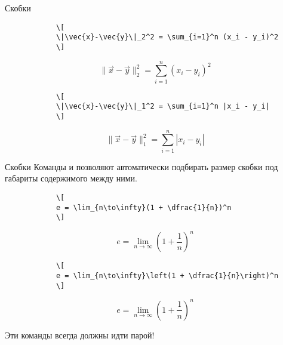 \begin{frame}[fragile]{Скобки}
	\begin{center}
		
	\end{center}
	
	\begin{minipage}{0.74\textwidth}
		\begin{verbatim}
			\[
			\|\vec{x}-\vec{y}\|_2^2 = \sum_{i=1}^n (x_i - y_i)^2  
			\]
		\end{verbatim}
	\end{minipage}
	\begin{minipage}{0.25\textwidth}
		\[
			\|\vec{x}-\vec{y}\|_2^2 = \sum_{i=1}^n (x_i - y_i)^2  
		\]
	\end{minipage}
	
	\begin{minipage}{0.74\textwidth}
		\begin{verbatim}
			\[
			\|\vec{x}-\vec{y}\|_1^2 = \sum_{i=1}^n |x_i - y_i|  
			\]
		\end{verbatim}
	\end{minipage}
	\begin{minipage}{0.25\textwidth}
		\[
		\|\vec{x}-\vec{y}\|_1^2 = \sum_{i=1}^n |x_i - y_i|  
		\]
	\end{minipage}
	
\end{frame}



\begin{frame}[fragile]{Скобки}
	Команды \texttt{\left} и \texttt{\right} позволяют автоматически подбирать размер скобки под габариты содержимого между ними. 
	
	\begin{minipage}{0.72\textwidth}
		\begin{verbatim}
			\[
			e = \lim_{n\to\infty}(1 + \dfrac{1}{n})^n
			\]
		\end{verbatim}
	\end{minipage}
	\begin{minipage}{0.27\textwidth}
		\Large
		\[
		e = \lim_{n\to\infty}(1 + \dfrac{1}{n})^n
		\]
	\end{minipage}
	
	\begin{minipage}{0.72\textwidth}
		\begin{verbatim}
			\[
			e = \lim_{n\to\infty}\left(1 + \dfrac{1}{n}\right)^n
			\]
		\end{verbatim}
	\end{minipage}
	\begin{minipage}{0.27\textwidth}
		\Large
		\[
		e = \lim_{n\to\infty}\left(1 + \dfrac{1}{n}\right)^n
		\]
	\end{minipage}

	Эти команды всегда должны идти парой!
	
\end{frame}


